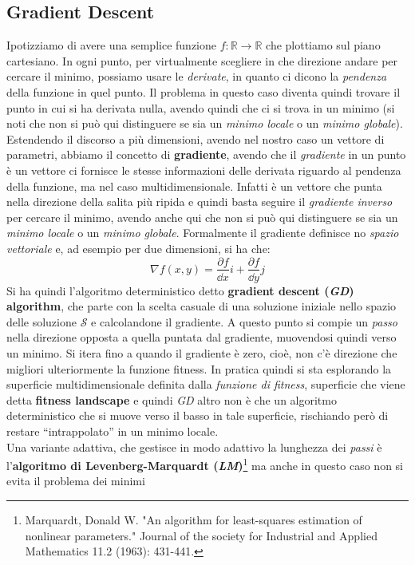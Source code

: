 \documentclass[a4paper,12pt, oneside]{book}
\begin{document}
\subsection{Gradient Descent}
Ipotizziamo di avere una semplice funzione $f:\mathbb{R}\to\mathbb{R}$ che
plottiamo sul piano cartesiano. In ogni punto, per virtualmente scegliere in che
direzione andare 
per cercare il minimo, possiamo usare le \textit{derivate}, in quanto ci dicono
la \textit{pendenza} della funzione in quel punto. Il problema in questo caso
diventa quindi trovare il punto in cui si ha derivata nulla, avendo quindi che
ci si trova in un minimo (si noti che non si può qui distinguere se sia un
\textit{minimo locale} o un \textit{minimo globale}).\\
Estendendo il discorso a più
dimensioni, avendo nel nostro caso un vettore di parametri, abbiamo il concetto
di \textbf{gradiente}, avendo che il 
\textit{gradiente} in un punto è un vettore ci fornisce le stesse informazioni
delle derivata riguardo al pendenza della funzione, ma nel caso
multidimensionale. Infatti è un vettore che punta nella direzione della salita
più ripida e quindi basta seguire il \textit{gradiente inverso} per cercare il
minimo, avendo anche qui che non si può qui distinguere se sia un
\textit{minimo locale} o un \textit{minimo globale}. Formalmente il gradiente
definisce no \textit{spazio 
  vettoriale} e, ad esempio per due dimensioni, si ha che:
\[\nabla f(x,y)=\frac{\partial f}{\dd{x}}i+\frac{\partial f}{\dd{y}}j\]
Si ha quindi l'algoritmo deterministico detto \textbf{gradient descent
  (\textit{GD}) algorithm}, che parte con la scelta casuale di una soluzione iniziale nello
spazio delle soluzione $\mathcal{S}$ e calcolandone il gradiente. A questo punto
si compie un \textit{passo} nella direzione opposta a quella puntata dal
gradiente, 
muovendosi quindi verso un minimo. Si itera fino a quando il gradiente è zero,
cioè, non c'è direzione che migliori ulteriormente la funzione fitness. In
pratica quindi si sta esplorando la superficie multidimensionale definita dalla
\textit{funzione di fitness}, superficie che viene detta \textbf{fitness
  landscape} e quindi \textit{GD} altro non è che un algoritmo deterministico
che si muove verso il basso in tale superficie, rischiando però di restare
``intrappolato'' in un minimo locale.\\ 
Una variante adattiva, che gestisce in modo adattivo la lunghezza dei
\textit{passi} è l'\textbf{algoritmo di Levenberg-Marquardt
  (\textit{LM})}\footnote{Marquardt, 
  Donald W. "An algorithm for least-squares estimation of nonlinear parameters."
  Journal of the society for Industrial and Applied Mathematics 11.2 (1963):
  431-441.} ma anche in questo caso non si evita il problema dei minimi
\end{document}
